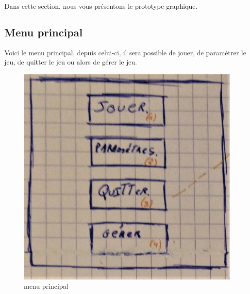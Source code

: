 Dans cette section, nous vous présentons le prototype graphique.

\subsection{Menu principal}
Voici le menu principal, depuis celui-ci, il sera possible de jouer, de paramétrer le jeu, de quitter le jeu ou alors de gérer le jeu.
\begin{figure}[ht]
	\centering
	\includegraphics[scale=0.5]{menu_principal.png}
	\caption{menu principal}
	\label{interface menu}
\end{figure}

\newpage
